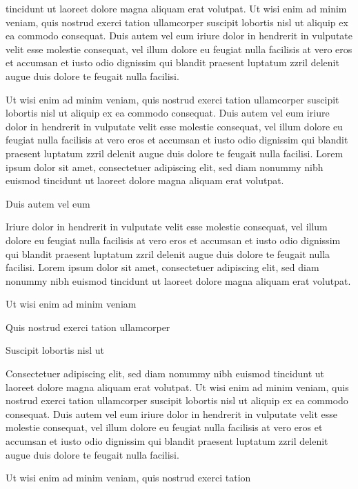 \documentclass[11pt]{article}\makeatletter
\begin{document}
      tincidunt ut laoreet dolore magna aliquam erat volutpat. Ut wisi enim
      ad minim veniam, quis nostrud exerci tation ullamcorper suscipit
      lobortis nisl ut aliquip ex ea commodo consequat. Duis autem vel eum
      iriure dolor in hendrerit in vulputate velit esse molestie consequat,
      vel illum dolore eu feugiat nulla facilisis at vero eros et accumsan
      et iusto odio dignissim qui blandit praesent luptatum zzril delenit
      augue duis dolore te feugait nulla facilisi.\par Ut wisi enim ad minim veniam, quis nostrud exerci tation
      ullamcorper suscipit lobortis nisl ut aliquip ex ea commodo
      consequat. Duis autem vel eum iriure dolor in hendrerit in vulputate
      velit esse molestie consequat, vel illum dolore eu feugiat nulla
      facilisis at vero eros et accumsan et iusto odio dignissim qui blandit
      praesent luptatum zzril delenit augue duis dolore te feugait nulla
      facilisi. Lorem ipsum dolor sit amet, consectetuer adipiscing elit,
      sed diam nonummy nibh euismod tincidunt ut laoreet dolore magna
      aliquam erat volutpat. \par Duis autem vel eum \par Iriure dolor in hendrerit in vulputate velit esse molestie
      consequat, vel illum dolore eu feugiat nulla facilisis at vero eros et
      accumsan et iusto odio dignissim qui blandit praesent luptatum zzril
      delenit augue duis dolore te feugait nulla facilisi. Lorem ipsum dolor
      sit amet, consectetuer adipiscing elit, sed diam nonummy nibh euismod
      tincidunt ut laoreet dolore magna aliquam erat volutpat. \par Ut wisi enim ad minim veniam\par Quis nostrud exerci tation ullamcorper \par Suscipit lobortis nisl ut \par Consectetuer adipiscing elit, sed diam nonummy nibh euismod
      tincidunt ut laoreet dolore magna aliquam erat volutpat. Ut wisi enim
      ad minim veniam, quis nostrud exerci tation ullamcorper suscipit
      lobortis nisl ut aliquip ex ea commodo consequat. Duis autem vel eum
      iriure dolor in hendrerit in vulputate velit esse molestie consequat,
      vel illum dolore eu feugiat nulla facilisis at vero eros et accumsan
      et iusto odio dignissim qui blandit praesent luptatum zzril delenit
      augue duis dolore te feugait nulla facilisi.\par Ut wisi enim ad minim veniam, quis nostrud exerci tation
\end{document}
